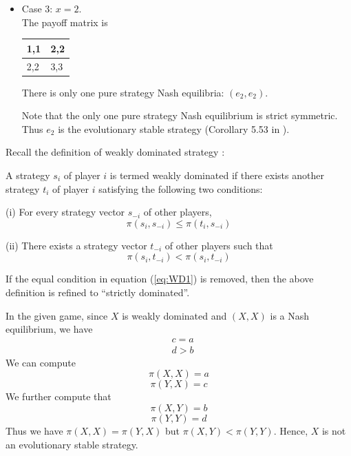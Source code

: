 \documentclass[a4 paper, 12pt]{article}
\begin{document}
\begin{itemize}
        \item Case 3: $x = 2$. \\
        The payoff matrix is 
        \begin{center}
                \begin{tabular}{ | m{1em} | m{1em}| } 
                \hline
                1,1& 2,2 \\ 
                \hline
                2,2 & 3,3 \\ 
                \hline
                \end{tabular}
        \end{center}
        There is only one pure strategy Nash equilibria: $(e_2,e_2)$. 

        Note that the only one pure strategy Nash equilibrium is strict symmetric. Thus $e_2$ is the evolutionary stable strategy (Corollary 5.53 in \cite{b1}). 

\end{itemize}

 Recall the definition of weakly dominated strategy \cite{b1}:
\begin{defi}
        A strategy $s_i$ of player $i$ is termed weakly dominated if there exists another strategy $t_i$ of player $i$ satisfying the following two conditions:\vspace{-0.5em}

        (i) For every strategy vector $s_{-i}$ of other players,
        \begin{equation}\label{eq:WD1}
                \pi(s_i,s_{-i}) \leq \pi(t_i,s_{-i})
        \end{equation}
        \vspace{-2.5em}

        (ii) There exists a strategy vector $t_{-i}$ of other players such that 
        \begin{equation}\label{eq:WD2}
                \pi(s_i,t_{-i}) < \pi(s_i,t_{-i})
        \end{equation}
\end{defi}
If the equal condition in equation (\ref{eq:WD1}) is removed, then the above definition is refined to ``strictly dominated''.

In the given game, since $X$ is weakly dominated and $(X,X)$ is a Nash equilibrium, we have 
\begin{align}
        & c = a \\
        & d > b
\end{align}
We can compute
\begin{equation}
        \pi(X,X) = a
\end{equation}
\begin{equation}
        \pi(Y,X) = c
\end{equation}
We further compute that 
\begin{equation}
        \pi(X,Y) = b
\end{equation}
\begin{equation}
        \pi(Y,Y) = d
\end{equation}
Thus we have $\pi(X,X) = \pi(Y,X)$ but $\pi(X,Y) < \pi(Y,Y)$. Hence, $X$ is not an evolutionary stable strategy.
\end{document}

